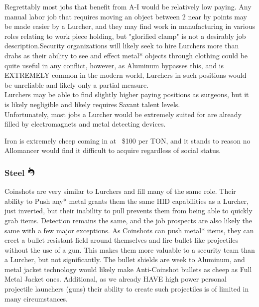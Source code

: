 \documentclass[conference]{IEEEtran}
\newcommand{\n}{\hfill\break}
\begin{document}
    Regrettably most jobs that benefit from A-I would be relatively low paying.  Any manual labor job that requires moving an object between 2 near by points may be made easier by a Lurcher, and they may find work in manufacturing in various roles relating to work piece holding, but "glorified clamp" is not a desirably job description.\n Security organizations will likely seek to hire Lurchers more than drabs as their ability to see and effect metal* objects through clothing could be quite useful in any conflict, however, as Aluminum bypasses this, and is EXTREMELY common in the modern world, Lurchers in such positions would be unreliable and likely only a partial measure.\\
    Lurchers may be able to find slightly higher paying positions as surgeons, but it is likely negligible and likely requires Savant talent levels. \\
    Unfortunately, most jobs a Lurcher would be extremely suited for are already filled by electromagnets and metal detecting devices.
    \n
    
    Iron is extremely cheep coming in at ~\$100 per TON, and it stands to reason no Allomancer would find it difficult to acquire regardless of social status.\n
	\subsubsection{\textbf{Steel}    \includegraphics[height=1em]{images/Steel.png}}\label{sec:mistings:steel}
	Coinshots are very similar to Lurchers and fill many of the same role.  Their ability to Push any* metal grants them the same HID capabilities as a Lurcher, just inverted, but their inability to pull prevents them from being able to quickly grab items.  Detection remains the same, and the job prospects are also likely the same with a few major exceptions.  As Coinshots can push metal* items, they can erect a bullet resistant field around themselves and fire bullet like projectiles without the use of a gun.  This makes them more valuable to a security team than a Lurcher, but not significantly.  The bullet shields are week to Aluminum, and metal jacket technology would likely make Anti-Coinshot bullets as cheep as Full Metal Jacket ones.  Additional, as we already HAVE high power personal projectile launchers (guns) their ability to create such projectiles is of limited in many circumstances. \n
	
\end{document}

